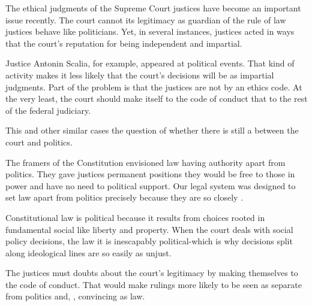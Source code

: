 The ethical judgments of the Supreme Court justices have become an
important issue recently. The court cannot \underline{\quad} its legitimacy as
guardian of the rule of law \underline{\quad} justices behave like politicians.
Yet, in several instances, justices acted in ways that \underline{\quad} the court’s
reputation for being independent and impartial.

Justice Antonin Scalia, for example, appeared at political events.
That kind of activity makes it less likely that the court’s decisions
will be \underline{\quad} as impartial judgments. Part of the problem is that the
justices are not \underline{\quad} by an ethics code. At the very least, the court
should make itself \underline{\quad} to the code of conduct that \underline{\quad} to the rest of
the federal judiciary.

This and other similar cases \underline{\quad} the question of whether there is still 
a \underline{\quad} between the court and politics.

The framers of the Constitution envisioned law \underline{\quad}  having authority
apart from politics. They gave justices permanent positions \underline{\quad}  they 
would be free to \underline{\quad}  those in power and have no need to \underline{\quad}  political
support. Our legal system was designed to set law apart from politics
precisely because they are so closely \underline{\quad}.

Constitutional law is political because it results from choices rooted
in fundamental social \underline{\quad}  like liberty and property. When the court
deals with social policy decisions, the law it \underline{\quad}  is inescapably
political-which is why decisions split along ideological lines are so
easily \underline{\quad}  as unjust.

The justices must \underline{\quad}  doubts about the court’s legitimacy by making
themselves \underline{\quad}  to the code of conduct. That would make rulings more
likely to be seen as separate from politics and, \underline{\quad}  , convincing as
law.

